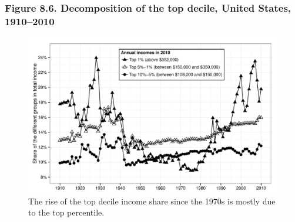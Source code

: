 \documentclass[t]{beamer}\usepackage[]{graphicx}\usepackage[]{color}
\newenvironment{knitrout}{}{} %
\begin{document}
\begin{frame}[label=Figure_8_6,fragile]
\frametitle{Figure 8.6. Decomposition of the top decile, United States, 1910--2010}
\begin{figure}[t]
\begin{minipage}[b]{\textwidth}
\centering
\begin{knitrout}\footnotesize
{}\color{fgcolor}

{\centering \includegraphics[width=1\linewidth]{figures/bw/Figure_8_6} 

}



\end{knitrout}
\caption{The rise of the top decile income share since the 1970s is mostly due to the top percentile.}
\end{minipage}
\end{figure}
\end{frame}
\end{document}
